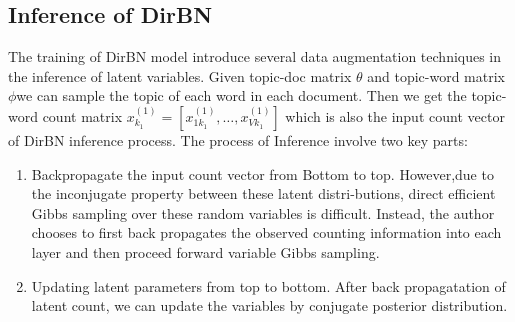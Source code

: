 \subsection{Inference of DirBN}
The training of DirBN model introduce several data augmentation techniques in the inference of latent variables.
Given topic-doc matrix $\theta$ and topic-word matrix $\phi$we can sample the topic of each word in each document. Then we get the topic-word count matrix $x_{k_1}^{(1)} = [x_{1k_1}^{(1)},\dots,x_{Vk_1}^{(1)}]$ which is also the input count vector of DirBN inference process.
The process of Inference involve two key parts:
\begin{enumerate}
  \item Backpropagate the input count vector from
Bottom to top. However,due to the inconjugate property between these latent distri-butions, direct efficient Gibbs sampling over these random variables is difficult. Instead, the author chooses to first back propagates the observed counting information into each layer and then proceed forward variable Gibbs sampling.
\item Updating latent parameters from top to bottom. After back propagatation of latent count, we can update the variables by conjugate posterior distribution.

\end{enumerate}
